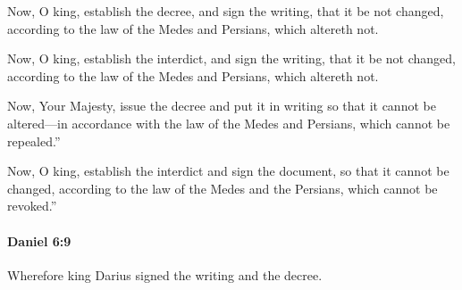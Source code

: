 			Now, O king, establish the decree, and sign the writing, that it be not changed, according to the law of the Medes and Persians, which altereth not.

			\begin{versebox}
					\item[BHS] 
					\item[ASV] Now, O king, establish the interdict, and sign the writing, that it be not changed, according to the law of the Medes and Persians, which altereth not.
					\item[NIV] Now, Your Majesty, issue the decree and put it in writing so that it cannot be altered—in accordance with the law of the Medes and Persians, which cannot be repealed.”
					\item[NRSV] Now, O king, establish the interdict and sign the document, so that it cannot be changed, according to the law of the Medes and the Persians, which cannot be revoked.”
			\end{versebox}

		\paragraph{Daniel 6:9} %
			\label{DANIEL-6-9}

			Wherefore king Darius signed the writing and the decree.


